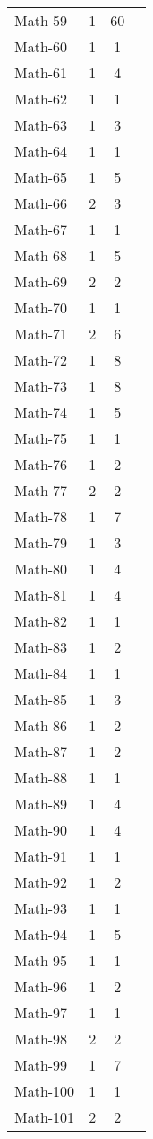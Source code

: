 \begin{footnotesize}
\begin{longtable}{lccc}
Math-59 & 1 & 60 & \\
Math-60 & 1 & 1 & \\
Math-61 & 1 & 4 & \\
Math-62 & 1 & 1 & \\
Math-63 & 1 & 3 & \\
Math-64 & 1 & 1 & \\
Math-65 & 1 & 5 & \\
Math-66 & 2 & 3 & \\
Math-67 & 1 & 1 & \\
Math-68 & 1 & 5 & \\
Math-69 & 2 & 2 & \\
Math-70 & 1 & 1 & \\
Math-71 & 2 & 6 & \\
Math-72 & 1 & 8 & \\
Math-73 & 1 & 8 & \\
Math-74 & 1 & 5 & \\
Math-75 & 1 & 1 & \\
Math-76 & 1 & 2 & \\
Math-77 & 2 & 2 & \\
Math-78 & 1 & 7 & \\
Math-79 & 1 & 3 & \\
Math-80 & 1 & 4 & \\
Math-81 & 1 & 4 & \\
Math-82 & 1 & 1 & \\
Math-83 & 1 & 2 & \\
Math-84 & 1 & 1 & \\
Math-85 & 1 & 3 & \\
Math-86 & 1 & 2 & \\
Math-87 & 1 & 2 & \\
Math-88 & 1 & 1 & \\
Math-89 & 1 & 4 & \\
Math-90 & 1 & 4 & \\
Math-91 & 1 & 1 & \\
Math-92 & 1 & 2 & \\
Math-93 & 1 & 1 & \\
Math-94 & 1 & 5 & \\
Math-95 & 1 & 1 & \\
Math-96 & 1 & 2 & \\
Math-97 & 1 & 1 & \\
Math-98 & 2 & 2 & \\
Math-99 & 1 & 7 & \\
Math-100 & 1 & 1 & \\
Math-101 & 2 & 2 & \\

\end{longtable}
\end{footnotesize}
